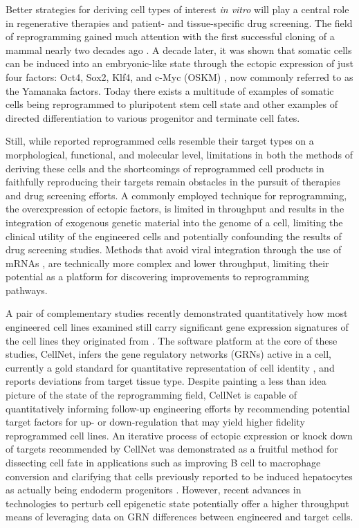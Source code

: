 \documentclass[10pt]{article}
\begin{document}
Better strategies for deriving cell types of interest \textit{in vitro} will play a central role in regenerative therapies and patient- and tissue-specific drug screening. The field of reprogramming gained much attention with the first successful cloning of a mammal nearly two decades ago \cite{campbell1996sheep}. A decade later, it was shown that somatic cells can be induced into an embryonic-like state through the ectopic expression of just four factors: Oct4, Sox2, Klf4, and c-Myc (OSKM) \cite{takahashi2006induction}, now commonly referred to as the Yamanaka factors. Today there exists a multitude of examples of somatic cells being reprogrammed to pluripotent stem cell state and other examples of directed differentiation to various progenitor and terminate cell fates.

Still, while reported reprogrammed cells resemble their target types on a morphological, functional, and molecular level, limitations in both the methods of deriving these cells and the shortcomings of reprogrammed cell products in faithfully reproducing their targets remain obstacles in the pursuit of therapies and drug screening efforts. A commonly employed technique for reprogramming, the overexpression of ectopic factors, is limited in throughput and results in the integration of exogenous genetic material into the genome of a cell, limiting the clinical utility of the engineered cells and potentially confounding the results of drug screening studies. Methods that avoid viral integration through the use of mRNAs \cite{warren2010highly}, are technically more complex and lower throughput, limiting their potential as a platform for discovering improvements to reprogramming pathways.

A pair of complementary studies recently demonstrated quantitatively how most engineered cell lines examined still carry significant gene expression signatures of the cell lines they originated from \cite{cahan2014cellnet, morris2014dissecting}. The software platform at the core of these studies, CellNet, infers the gene regulatory networks (GRNs) active in a cell, currently a gold standard for quantitative representation of cell identity \cite{davidson2006gene}, and reports deviations from target tissue type. Despite painting a less than idea picture of the state of the reprogramming field, CellNet is capable of quantitatively informing follow-up engineering efforts by recommending potential target factors for up- or down-regulation that may yield higher fidelity reprogrammed cell lines. An iterative process of ectopic expression or knock down of targets recommended by CellNet was demonstrated as a fruitful method for dissecting cell fate in applications such as improving B cell to macrophage conversion and clarifying that cells previously reported to be induced hepatocytes as actually being endoderm progenitors \cite{morris2014dissecting}. However, recent advances in technologies to perturb cell epigenetic state potentially offer a higher throughput means of leveraging data on GRN differences between engineered and target cells.
\end{document}
